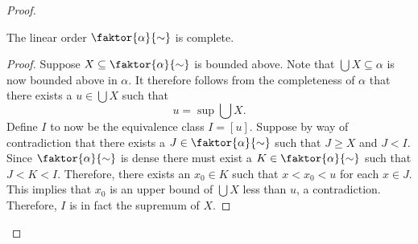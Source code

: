 \begin{proof}
	\begin{claim}
		The linear order $\faktor{\alpha}{\sim}$ is complete.
	\end{claim}
	\begin{proof}
		Suppose $X\subseteq\faktor{\alpha}{\sim}$ is bounded above.  Note that $\bigcup X\subseteq\alpha$ is now bounded above in $\alpha$.  It therefore follows from the completeness of $\alpha$ that there exists a $u\in\bigcup X$ such that
		\begin{equation}
			u=\sup\bigcup X.
		\end{equation}
		Define $I$ to now be the equivalence class $I=[u]$.  Suppose by way of contradiction that there exists a $J\in\faktor{\alpha}{\sim}$ such that $J\geq X$ and $J<I$.  Since $\faktor{\alpha}{\sim}$ is dense there must exist a $K\in\faktor{\alpha}{\sim}$ such that $J<K<I$.  Therefore, there exists an $x_0\in K$ such that $x<x_0<u$ for each $x\in J$.  This implies that $x_0$ is an upper bound of $\bigcup X$ less than $u$, a contradiction.  Therefore, $I$ is in fact the supremum of $X$.
	\end{proof}


\end{proof}
